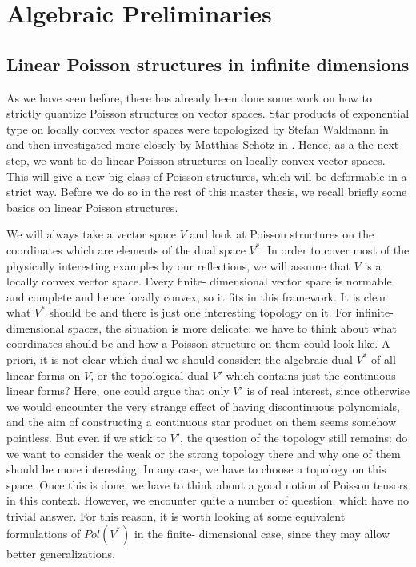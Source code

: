  
%
%

\chapter{Algebraic Preliminaries}


\section{Linear Poisson structures in infinite dimensions}
\label{sec:chap3_LinearPoisson}

As we have seen before, there has already been done some work on how to 
strictly quantize Poisson structures on vector spaces. Star products of
exponential type on locally convex vector spaces were topologized by Stefan 
Waldmann in \cite{waldmann:2014a} and then investigated more closely by 
Matthias Schötz in \cite{schoetz:2014a}. Hence, as a the next step, we want 
to do linear Poisson structures on locally convex vector spaces. This 
will give a new big class of Poisson structures, which will be deformable 
in a strict way. Before we do so in the rest of this master thesis, we 
recall briefly some basics on linear Poisson structures.


We will always take a vector space $V$ and look at Poisson structures on 
the coordinates which are elements of the dual space $V^*$. In order to 
cover most of the physically interesting examples by our reflections, we 
will assume that $V$ is a locally convex vector space. Every finite-
dimensional vector space is normable and complete and hence locally convex, 
so it fits in this framework. It is clear what $V^*$ should be and there is 
just one interesting topology on it. For infinite-dimensional spaces, the 
situation is more delicate: we have to think about what coordinates should 
be and how a Poisson structure on them could look like. A priori, it is not 
clear which dual we should consider: the algebraic dual $V^*$ of all linear 
forms on $V$, or the topological dual $V'$ which contains just the 
continuous linear forms? Here, one could argue that only $V'$ is of real 
interest, since otherwise we would encounter the very strange effect of 
having discontinuous polynomials, and the aim of constructing a continuous 
star product on them seems somehow pointless. 
But even if we stick to $V'$, the question of the topology still remains: 
do we want to consider the weak or the strong topology there and why one of 
them should be more interesting. In any case, we have to choose a topology 
on this space. Once this is done, we have to think about a good notion of 
Poisson tensors in this context. However, we encounter quite a number of 
question, which have no trivial answer. For this reason, it is worth 
looking at some equivalent formulations of $Pol(V^*)$ in the finite-
dimensional case, since they may allow better generalizations.


